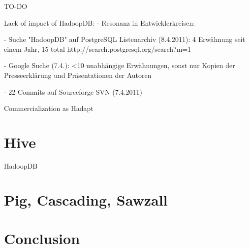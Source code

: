 \documentclass[12pt,a4paper]{scrartcl}		%
\begin{document}
TO-DO

Lack of impact of HadoopDB:
  - Resonanz in Entwicklerkreisen:

    - Suche "HadoopDB" auf PostgreSQL Listenarchiv (8.4.2011): 4 Erwähnung seit einem Jahr, 15 total
      http://search.postgresql.org/search?m=1

    - Google Suche (7.4.): <10 unabhängige Erwähnungen, sonst nur Kopien der Presseerklärung und Präsentationen der Autoren

    - 22 Commits auf Sourceforge SVN (7.4.2011)

Commercialization as Hadapt

\section{Hive}
HadoopDB 

\section{Pig, Cascading, Sawzall}

\section{Conclusion}



{}

\end{document}
